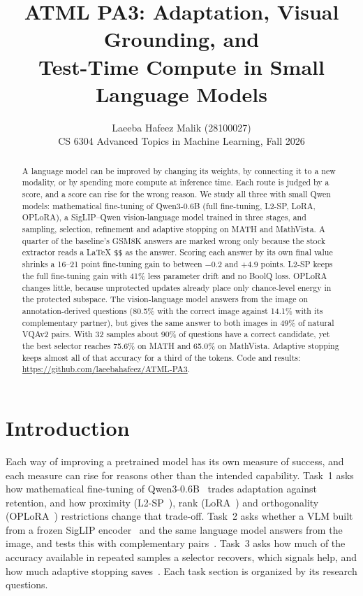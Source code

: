 \documentclass{article}
\title{ATML PA3: Adaptation, Visual Grounding, and\\ Test-Time Compute in Small Language Models}
\author{%
  Laeeba Hafeez Malik (28100027)\\
  CS 6304 Advanced Topics in Machine Learning, Fall 2026
}
\begin{document}
\maketitle

\begin{abstract}
A language model can be improved by changing its weights, by connecting it to a new modality, or by spending more compute at inference time. Each route is judged by a score, and a score can rise for the wrong reason. We study all three with small Qwen models: mathematical fine-tuning of Qwen3-0.6B (full fine-tuning, L2-SP, LoRA, OPLoRA), a SigLIP--Qwen vision-language model trained in three stages, and sampling, selection, refinement and adaptive stopping on MATH and MathVista. A quarter of the baseline's GSM8K answers are marked wrong only because the stock extractor reads a LaTeX \texttt{\$\$} as the answer. Scoring each answer by its own final value shrinks a 16--21 point fine-tuning gain to between $-0.2$ and $+4.9$ points. L2-SP keeps the full fine-tuning gain with 41\% less parameter drift and no BoolQ loss. OPLoRA changes little, because unprotected updates already place only chance-level energy in the protected subspace. The vision-language model answers from the image on annotation-derived questions (80.5\% with the correct image against 14.1\% with its complementary partner), but gives the same answer to both images in 49\% of natural VQAv2 pairs. With 32 samples about 90\% of questions have a correct candidate, yet the best selector reaches 75.6\% on MATH and 65.0\% on MathVista. Adaptive stopping keeps almost all of that accuracy for a third of the tokens. Code and results: \url{https://github.com/laeebahafeez/ATML-PA3}.
\end{abstract}

\section{Introduction}
Each way of improving a pretrained model has its own measure of success, and each measure can rise for reasons other than the intended capability. Task~1 asks how mathematical fine-tuning of Qwen3-0.6B~\cite{qwen3} trades adaptation against retention, and how proximity (L2-SP~\cite{li2018l2sp}), rank (LoRA~\cite{hu2022lora}) and orthogonality (OPLoRA~\cite{xiong2025oplora}) restrictions change that trade-off. Task~2 asks whether a VLM built from a frozen SigLIP encoder~\cite{zhai2023siglip} and the same language model answers from the image, and tests this with complementary pairs~\cite{goyal2017vqav2}. Task~3 asks how much of the accuracy available in repeated samples a selector recovers, which signals help, and how much adaptive stopping saves~\cite{hendrycks2021math,lu2024mathvista}. Each task section is organized by its research questions.
\end{document}
